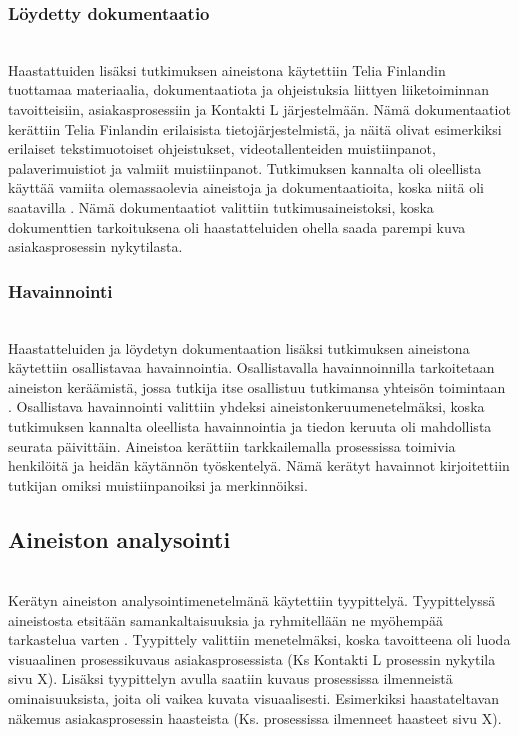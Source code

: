 \documentclass[finnish,12pt,a4paper,pdftex]{article}
\begin{document}
\subsubsection{Löydetty dokumentaatio}\\
Haastattuiden lisäksi tutkimuksen aineistona käytettiin Telia Finlandin tuottamaa materiaalia, dokumentaatiota ja ohjeistuksia liittyen liiketoiminnan tavoitteisiin, asiakasprosessiin ja Kontakti L järjestelmään. Nämä dokumentaatiot kerättiin Telia Finlandin erilaisista tietojärjestelmistä, ja näitä olivat esimerkiksi erilaiset tekstimuotoiset ohjeistukset, videotallenteiden muistiinpanot, palaverimuistiot ja valmiit muistiinpanot.  Tutkimuksen kannalta oli oleellista käyttää vamiita olemassaolevia aineistoja ja dokumentaatioita, koska niitä oli saatavilla \citep{eskola}. Nämä dokumentaatiot valittiin tutkimusaineistoksi, koska dokumenttien tarkoituksena oli haastatteluiden ohella saada parempi kuva asiakasprosessin nykytilasta.

\subsubsection{Havainnointi}\\
Haastatteluiden ja löydetyn dokumentaation lisäksi tutkimuksen aineistona käytettiin osallistavaa havainnointia. Osallistavalla havainnoinnilla tarkoitetaan aineiston keräämistä, jossa tutkija itse osallistuu tutkimansa yhteisön toimintaan \citep{eskola}. 
Osallistava havainnointi valittiin yhdeksi aineistonkeruumenetelmäksi, koska tutkimuksen kannalta oleellista havainnointia ja tiedon keruuta oli mahdollista seurata päivittäin. 
Aineistoa kerättiin tarkkailemalla prosessissa toimivia henkilöitä ja heidän käytännön työskentelyä. Nämä kerätyt havainnot kirjoitettiin tutkijan omiksi muistiinpanoiksi ja merkinnöiksi.

\subsection{Aineiston analysointi}\\
Kerätyn aineiston analysointimenetelmänä käytettiin tyypittelyä. Tyypittelyssä aineistosta etsitään samankaltaisuuksia ja ryhmitellään ne myöhempää tarkastelua varten \citep{eskola}. Tyypittely valittiin menetelmäksi, koska tavoitteena oli luoda visuaalinen prosessikuvaus asiakasprosessista (Ks Kontakti L prosessin nykytila sivu X). Lisäksi tyypittelyn avulla saatiin kuvaus prosessissa ilmenneistä ominaisuuksista, joita oli vaikea kuvata visuaalisesti. Esimerkiksi haastateltavan näkemus asiakasprosessin haasteista (Ks. prosessissa ilmenneet haasteet sivu X). \\
\\
\\
\\
\end{document}
